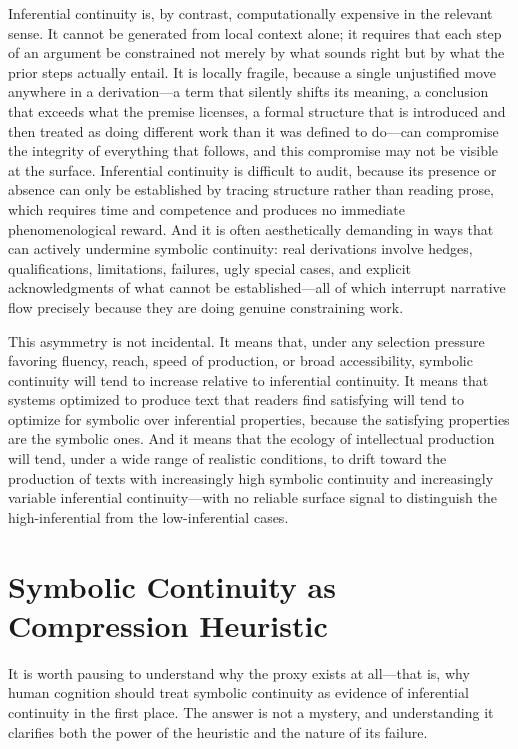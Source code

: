 \documentclass[12pt, openright, twoside]{book}
\begin{document}
Inferential continuity is, by contrast, computationally expensive in the relevant
sense. It cannot be generated from local context alone; it requires that each
step of an argument be constrained not merely by what sounds right but by what
the prior steps actually entail. It is locally fragile, because a single
unjustified move anywhere in a derivation---a term that silently shifts its
meaning, a conclusion that exceeds what the premise licenses, a formal structure
that is introduced and then treated as doing different work than it was defined
to do---can compromise the integrity of everything that follows, and this
compromise may not be visible at the surface. Inferential continuity is difficult
to audit, because its presence or absence can only be established by tracing
structure rather than reading prose, which requires time and competence and
produces no immediate phenomenological reward. And it is often aesthetically
demanding in ways that can actively undermine symbolic continuity: real derivations
involve hedges, qualifications, limitations, failures, ugly special cases, and
explicit acknowledgments of what cannot be established---all of which interrupt
narrative flow precisely because they are doing genuine constraining work.

This asymmetry is not incidental. It means that, under any selection pressure
favoring fluency, reach, speed of production, or broad accessibility, symbolic
continuity will tend to increase relative to inferential continuity. It means
that systems optimized to produce text that readers find satisfying will tend
to optimize for symbolic over inferential properties, because the satisfying
properties are the symbolic ones. And it means that the ecology of intellectual
production will tend, under a wide range of realistic conditions, to drift toward
the production of texts with increasingly high symbolic continuity and increasingly
variable inferential continuity---with no reliable surface signal to distinguish
the high-inferential from the low-inferential cases.

\section{Symbolic Continuity as Compression Heuristic}

It is worth pausing to understand why the proxy exists at all---that is, why human
cognition should treat symbolic continuity as evidence of inferential continuity
in the first place. The answer is not a mystery, and understanding it clarifies
both the power of the heuristic and the nature of its failure.
\end{document}
